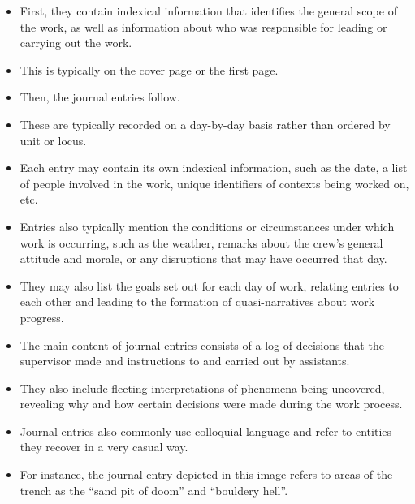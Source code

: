 \documentclass{article}
\begin{document}
\begin{itemize}
  \item First, they contain indexical information that identifies the general scope of the work, as well as information about who was responsible for leading or carrying out the work.
  \item This is typically on the cover page or the first page.
  \item Then, the journal entries follow.
  \item These are typically recorded on a day-by-day basis rather than ordered by unit or locus.
  \item Each entry may contain its own indexical information, such as the date, a list of people involved in the work, unique identifiers of contexts being worked on, etc.
  \item Entries also typically mention the conditions or circumstances under which work is occurring, such as the weather, remarks about the crew’s general attitude and morale, or any disruptions that may have occurred that day.
  \item They may also list the goals set out for each day of work, relating entries to each other and leading to the formation of quasi-narratives about work progress.
  \item The main content of journal entries consists of a log of decisions that the supervisor made and instructions to and carried out by assistants.
  \item They also include fleeting interpretations of phenomena being uncovered, revealing why and how certain decisions were made during the work process.
  \item Journal entries also commonly use colloquial language and refer to entities they recover in a very casual way.
  \item For instance, the journal entry depicted in this image refers to areas of the trench as the ``sand pit of doom'' and ``bouldery hell''.\\
  

\end{itemize}
\end{document}
